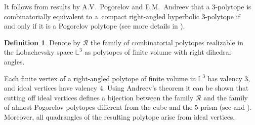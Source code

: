 \documentclass[12pt]{amsart}
\theoremstyle{definition}
\newtheorem{definition}[formula]{Definition}
\theoremstyle{remark}
\begin{document}
It follows from results by A.V.~Pogorelov and E.M.~Andreev that a 
$3$-polytope is combinatorially equivalent to a~compact right-angled hyperbolic $3$-polytope if and only if
it is a Pogorelov polytope (see more details in \cite{E19}). 

\begin{definition}
Denote by $\mathcal{R}$ the family of combinatorial polytopes realizable in the Lobachevsky space $\mathbb L^3$ 
as polytopes of finite volume with right dihedral angles.
\end{definition}
Each finite vertex of a right-angled polytope of finite volume in $\mathbb L^3$ 
has valency $3$, and ideal vertices have valency $4$. Using Andreev's theorem it can be shown that cutting off ideal vertices 
defines a bijection between the family $\mathcal{R}$ and the family of almost Pogorelov polytopes different from the cube and the $5$-prism (see
\cite[Theorem 10.3.1]{DO01} and \cite[Theorem 6.5]{E19}). Moreover, all quadrangles of the resulting
polytope arise from ideal vertices. 
\end{document}
